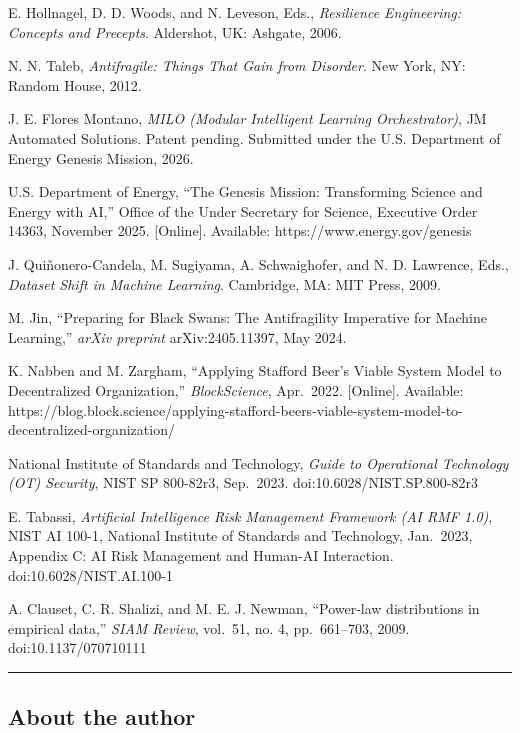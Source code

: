 \cite{ref2} E. Hollnagel, D. D. Woods, and N. Leveson, Eds.,
\emph{Resilience Engineering: Concepts and Precepts}. Aldershot, UK:
Ashgate, 2006.

\cite{ref3} N. N. Taleb, \emph{Antifragile: Things That Gain from Disorder}.
New York, NY: Random House, 2012.

\cite{ref4} J. E. Flores Montano, \emph{MILO (Modular Intelligent Learning
Orchestrator)}, JM Automated Solutions. Patent pending. Submitted under
the U.S. Department of Energy Genesis Mission, 2026.

\cite{ref5} U.S. Department of Energy, ``The Genesis Mission: Transforming
Science and Energy with AI,'' Office of the Under Secretary for Science,
Executive Order 14363, November 2025. {[}Online{]}. Available:
https://www.energy.gov/genesis

\cite{ref6} J. Quiñonero-Candela, M. Sugiyama, A. Schwaighofer, and N. D.
Lawrence, Eds., \emph{Dataset Shift in Machine Learning}. Cambridge, MA:
MIT Press, 2009.

\cite{ref7} M. Jin, ``Preparing for Black Swans: The Antifragility
Imperative for Machine Learning,'' \emph{arXiv preprint}
arXiv:2405.11397, May 2024.

\cite{ref8} K. Nabben and M. Zargham, ``Applying Stafford Beer's Viable
System Model to Decentralized Organization,'' \emph{BlockScience},
Apr.~2022. {[}Online{]}. Available:
https://blog.block.science/applying-stafford-beers-viable-system-model-to-decentralized-organization/

\cite{ref9} National Institute of Standards and Technology, \emph{Guide to
Operational Technology (OT) Security}, NIST SP 800-82r3, Sep.~2023.
doi:10.6028/NIST.SP.800-82r3

\cite{ref10} E. Tabassi, \emph{Artificial Intelligence Risk Management
Framework (AI RMF 1.0)}, NIST AI 100-1, National Institute of Standards
and Technology, Jan.~2023, Appendix C: AI Risk Management and Human-AI
Interaction. doi:10.6028/NIST.AI.100-1

\cite{ref11} A. Clauset, C. R. Shalizi, and M. E. J. Newman, ``Power-law
distributions in empirical data,'' \emph{SIAM Review}, vol.~51, no. 4,
pp.~661--703, 2009. doi:10.1137/070710111

\begin{center}\rule{0.5\linewidth}{0.5pt}\end{center}

\subsection{About the author}\label{about-the-author}

